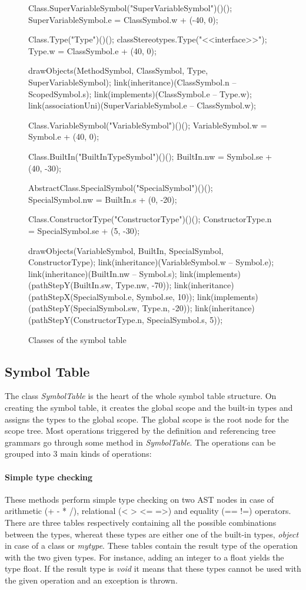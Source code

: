 \begin{figure}[H]
\begin{emp}[classdiag]
	Class.SuperVariableSymbol("SuperVariableSymbol")()();
	SuperVariableSymbol.e = ClassSymbol.w + (-40, 0);

	Class.Type("Type")()();
	classStereotypes.Type("<<interface>>");
	Type.w = ClassSymbol.e + (40, 0);

	drawObjects(MethodSymbol, ClassSymbol, Type, SuperVariableSymbol);
	link(inheritance)(ClassSymbol.n -- ScopedSymbol.s);
	link(implements)(ClassSymbol.e -- Type.w);
	link(associationUni)(SuperVariableSymbol.e -- ClassSymbol.w);


	Class.VariableSymbol("VariableSymbol")()();
	VariableSymbol.w = Symbol.e + (40, 0);

	Class.BuiltIn("BuiltInTypeSymbol")()();
	BuiltIn.nw = Symbol.se + (40, -30);

	AbstractClass.SpecialSymbol("SpecialSymbol")()();
	SpecialSymbol.nw = BuiltIn.s + (0, -20);

	Class.ConstructorType("ConstructorType")()();
	ConstructorType.n = SpecialSymbol.se + (5, -30);

	drawObjects(VariableSymbol, BuiltIn, SpecialSymbol, ConstructorType);
	link(inheritance)(VariableSymbol.w -- Symbol.e);
	link(inheritance)(BuiltIn.nw -- Symbol.s);
	link(implements)(pathStepY(BuiltIn.sw, Type.nw, -70));
	link(inheritance)(pathStepX(SpecialSymbol.e, Symbol.se, 10));
	link(implements)(pathStepY(SpecialSymbol.sw, Type.n, -20));
	link(inheritance)(pathStepY(ConstructorType.n, SpecialSymbol.s, 5));

	\end{emp}
	\caption{Classes of the symbol table}
	\label{fig:classes}
\end{figure}

\subsection{Symbol Table}
\label{sec:symbolTableDescription}

The class \emph{SymbolTable} is the heart of the whole symbol table structure.
On creating the symbol table, it creates the global scope and the built-in
types and assigns the types to the global scope. The global scope is the root
node for the scope tree. Most operations triggered by the definition and
referencing tree grammars go through some method in \emph{SymbolTable}.
The operations can be grouped into 3 main kinds of operations:

\paragraph{Simple type checking}
These methods perform simple type checking on two AST nodes in case of
arithmetic (+ - * /), relational (< > <= =>) and equality (== !=) operators.
There are three tables respectively containing all the possible combinations
between the types, whereat these types are either one of the built-in types,
\emph{object} in case of a class or \emph{mytype}. These tables contain the
result type of the operation with the two given types. For instance, adding
an integer to a float yields the type float. If the result type
is \emph{void} it means that these types cannot be used with the given
operation and an exception is thrown.

